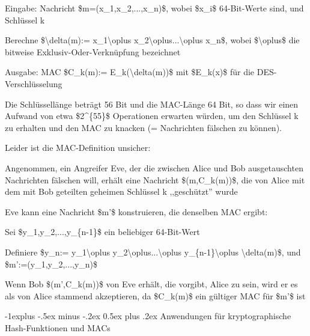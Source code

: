 \documentclass[a4paper]{article}
\makeatletter
\renewcommand{\subsection}{\@startsection{subsection}{2}{0mm}%
 {-1explus -.5ex minus -.2ex}%
 {0.5ex plus .2ex}%
 {\normalfont\normalsize\bfseries}}
\makeatother
\begin{document}
\begin{multicols}{3}
\begin{itemize*}
            \begin{itemize*}
                  \item Eingabe: Nachricht \$m=(x\_1,x\_2,...,x\_n)\$, wobei \$x\_i\$ 64-Bit-Werte sind, und Schlüssel k
                  \item Berechne \$\textbackslash delta(m):= x\_1\textbackslash oplus x\_2\textbackslash oplus...\textbackslash oplus x\_n\$, wobei \$\textbackslash oplus\$ die bitweise Exklusiv-Oder-Verknüpfung bezeichnet
                  \item Ausgabe: MAC \$C\_k(m):= E\_k(\textbackslash delta(m))\$ mit \$E\_k(x)\$ für die DES-Verschlüsselung
            \end{itemize*}
            \item
            Die Schlüssellänge beträgt 56 Bit und die MAC-Länge 64 Bit, so dass
            wir einen Aufwand von etwa \$2\^{}\{55\}\$ Operationen erwarten
            würden, um den Schlüssel k zu erhalten und den MAC zu knacken (=
            Nachrichten fälschen zu können).
            \item
            Leider ist die MAC-Definition unsicher:

            \begin{itemize*}
                  \item Angenommen, ein Angreifer Eve, der die zwischen Alice und Bob ausgetauschten Nachrichten fälschen will, erhält eine Nachricht \$(m,C\_k(m))\$, die von Alice mit dem mit Bob geteilten geheimen Schlüssel k ,,geschützt'' wurde
                  \item Eve kann eine Nachricht \$m'\$ konstruieren, die denselben MAC ergibt:
                  \begin{itemize*} \item Sei \$y\_1,y\_2,...,y\_\{n-1\}\$ ein beliebiger 64-Bit-Wert \item Definiere \$y\_n:= y\_1\textbackslash oplus y\_2\textbackslash oplus...\textbackslash oplus y\_\{n-1\}\textbackslash oplus \textbackslash delta(m)\$, und \$m':=(y\_1,y\_2,...,y\_n)\$ \item Wenn Bob \$(m',C\_k(m))\$ von Eve erhält, die vorgibt, Alice zu sein, wird er es als von Alice stammend akzeptieren, da \$C\_k(m)\$ ein gültiger MAC für \$m'\$ ist \end{itemize*}
            \end{itemize*}
      \end{itemize*}


      \subsection{Anwendungen für kryptographische Hash-Funktionen und
            MACs}


\end{multicols}
\end{document}

